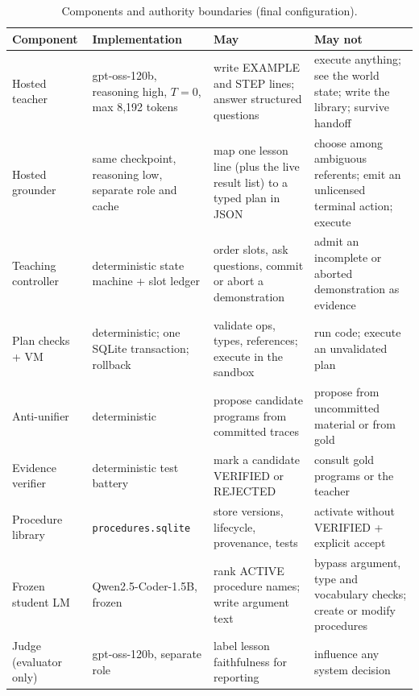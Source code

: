 \documentclass[10pt]{article}
\newcommand{\id}[1]{\nolinkurl{#1}}
\begin{document}
\begin{table}[t]
\centering\small
\caption{Components and authority boundaries (final configuration).}
\label{tab:components}
\begin{tabularx}{\linewidth}{@{}l>{\raggedright}p{2.6cm}>{\raggedright}X>{\raggedright\arraybackslash}X@{}}
\toprule
Component & Implementation & May & May not \\
\midrule
Hosted teacher & gpt-oss-120b, reasoning high, $T{=}0$, max 8{,}192 tokens & write EXAMPLE and STEP lines; answer structured questions & execute anything; see the world state; write the library; survive handoff \\
Hosted grounder & same checkpoint, reasoning low, separate role and cache & map one lesson line (plus the live result list) to a typed plan in JSON & choose among ambiguous referents; emit an unlicensed terminal action; execute \\
Teaching controller & deterministic state machine + slot ledger & order slots, ask questions, commit or abort a demonstration & admit an incomplete or aborted demonstration as evidence \\
Plan checks + VM & deterministic; one SQLite transaction; rollback & validate ops, types, references; execute in the sandbox & run code; execute an unvalidated plan \\
Anti-unifier & deterministic & propose candidate programs from committed traces & propose from uncommitted material or from gold \\
Evidence verifier & deterministic test battery & mark a candidate VERIFIED or REJECTED & consult gold programs or the teacher \\
Procedure library & \id{procedures.sqlite} & store versions, lifecycle, provenance, tests & activate without VERIFIED + explicit accept \\
Frozen student LM & Qwen2.5-Coder-1.5B, frozen & rank ACTIVE procedure names; write argument text & bypass argument, type and vocabulary checks; create or modify procedures \\
Judge (evaluator only) & gpt-oss-120b, separate role & label lesson faithfulness for reporting & influence any system decision \\
\bottomrule
\end{tabularx}
\end{table}
\end{document}
